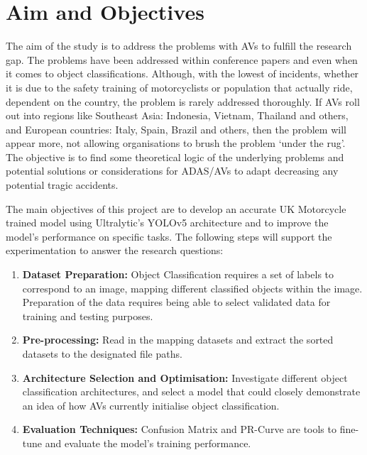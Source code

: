\documentclass[12pt]{report} %
\begin{document}
	\section{Aim and Objectives}
        The aim of the study is to address the problems with AVs to fulfill the research gap. The problems have been addressed within conference papers and even when it comes to object classifications. Although, with the lowest of incidents, whether it is due to the safety training of motorcyclists or population that actually ride, dependent on the country, the problem is rarely addressed thoroughly. If AVs roll out into regions like Southeast Asia: Indonesia, Vietnam, Thailand and others, and European countries: Italy, Spain, Brazil and others, then the problem will appear more, not allowing organisations to brush the problem `under the rug'. The objective is to find some theoretical logic of the underlying problems and potential solutions or considerations for ADAS/AVs to adapt decreasing any potential tragic accidents.

		The main objectives of this project are to develop an accurate UK Motorcycle trained model using Ultralytic's YOLOv5 architecture and to improve the model's performance on specific tasks. The following steps will support the experimentation to answer the research questions:

        \begin{enumerate}
            \item \textbf{Dataset Preparation:} Object Classification requires a set of labels to correspond to an image, mapping different classified objects within the image. Preparation of the data requires being able to select validated data for training and testing purposes.
            \item \textbf{Pre-processing:} Read in the mapping datasets and extract the sorted datasets to the designated file paths. 
            \item \textbf{Architecture Selection and Optimisation:} Investigate different object classification architectures, and select a model that could closely demonstrate an idea of how AVs currently initialise object classification.
            \item \textbf{Evaluation Techniques:} Confusion Matrix and PR-Curve are tools to fine-tune and evaluate the model's training performance.
        \end{enumerate}
\end{document}
